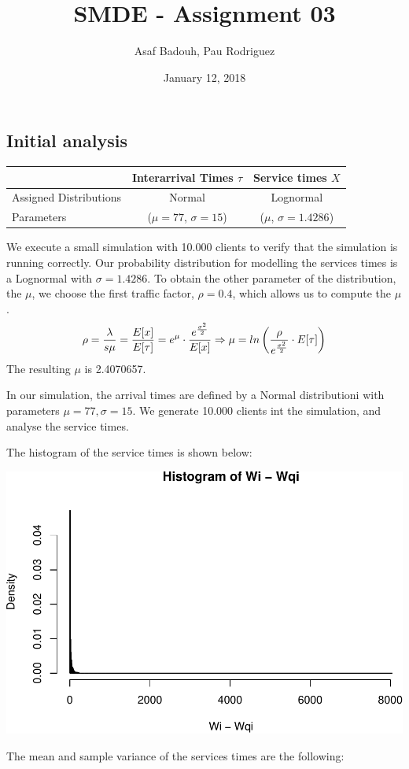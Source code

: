 \documentclass[]{article}
\title{SMDE - Assignment 03}
\author{Asaf Badouh, Pau Rodriguez}
\date{January 12, 2018}
\begin{document}
\maketitle

\subsection{Initial analysis}\label{initial-analysis}

\begin{longtable}[]{@{}lcc@{}}
\toprule
& Interarrival Times \(\tau\) & Service times \(X\)\tabularnewline
\midrule
\endhead
Assigned Distributions & Normal & Lognormal\tabularnewline
Parameters & (\(\mu=77\), \(\sigma=15\)) & (\(\mu\),
\(\sigma=1.4286\))\tabularnewline
\bottomrule
\end{longtable}

We execute a small simulation with 10.000 clients to verify that the
simulation is running correctly. Our probability distribution for
modelling the services times is a Lognormal with \(\sigma=1.4286\). To
obtain the other parameter of the distribution, the \(\mu\), we choose
the first traffic factor, \(\rho=0.4\), which allows us to compute the
\(\mu\).\\
\[  \rho = { \lambda \over {s\mu}} = { E[x] \over E[\tau] } = e^{\mu} \cdot { e^{\sigma^{2} \over 2} \over E[x] } \Rightarrow \mu = ln \left( { \rho \over e^{ \sigma^{2} \over 2 } } \cdot E[\tau]  \right) \]
The resulting \(\mu\) is 2.4070657.

In our simulation, the arrival times are defined by a Normal
distributioni with parameters \(\mu=77, \sigma=15\). We generate 10.000
clients int the simulation, and analyse the service times.

The histogram of the service times is shown below:

\begin{center}\includegraphics[width=0.5\linewidth]{003_files/figure-latex/unnamed-chunk-6-1} \end{center}

The mean and sample variance of the services times are the following:
\end{document}
